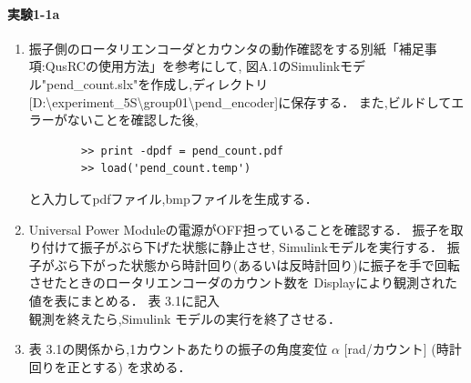 \paragraph{実験1-1a}
\begin{enumerate}
  \item \quad 振子側のロータリエンコーダとカウンタの動作確認をする別紙「補足事項:QusRCの使用方法」を参考にして,
        図A.1のSimulinkモデル"pend\_count.slx"を作成し,ディレクトリ
        [D:\textbackslash experiment\_5S\textbackslash group01\textbackslash pend\_encoder]に保存する．
        また,ビルドしてエラーがないことを確認した後,
        
        \begin{tcolorbox}[colback=gray!5!white,colframe=gray!75!black]
          \begin{lstlisting}
        >> print -dpdf = pend_count.pdf
        >> load('pend_count.temp')
        \end{lstlisting}
        \end{tcolorbox}
        
        と入力してpdfファイル,bmpファイルを生成する．
        
  \item \quad Universal Power Moduleの電源がOFF担っていることを確認する．
        振子を取り付けて振子がぶら下げた状態に静止させ, Simulinkモデルを実行する．
        振子がぶら下がった状態から時計回り(あるいは反時計回り)に振子を手で回転させたときのロータリエンコーダのカウント数を
        Displayにより観測された値を表にまとめる． 表 3.1に記入 \\
        \quad 観測を終えたら,Simulink モデルの実行を終了させる．
        
  \item \quad 表 3.1の関係から,1カウントあたりの振子の角度変位  \(\alpha \) [rad/カウント] (時計回りを正とする)
        を求める．
        

\end{enumerate}
